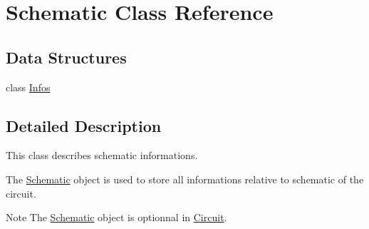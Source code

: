 \hypertarget{class_schematic}{}\section{Schematic Class Reference}
\label{class_schematic}
\subsection*{Data Structures}
\begin{DoxyCompactItemize}
\item 
class \mbox{\hyperlink{class_schematic_1_1_infos}{Infos}}
\end{DoxyCompactItemize}


\subsection{Detailed Description}
This class describes schematic informations.

The \mbox{\hyperlink{class_schematic}{Schematic}} object is used to store all informations relative to schematic of the circuit.

\begin{DoxyNote}{Note}
The \mbox{\hyperlink{class_schematic}{Schematic}} object is optionnal in \mbox{\hyperlink{class_circuit}{Circuit}}. 
\end{DoxyNote}
